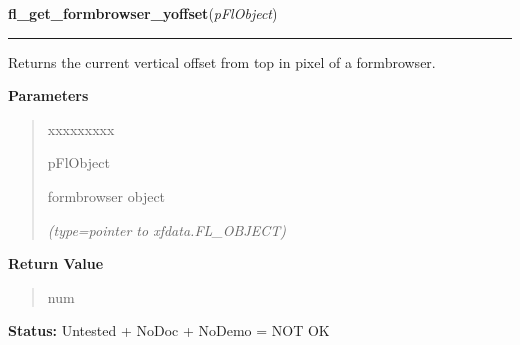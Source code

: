 \hspace{.8\funcindent}\begin{boxedminipage}{\funcwidth}

    \raggedright \textbf{fl\_get\_formbrowser\_yoffset}(\textit{pFlObject})

    \vspace{-1.5ex}

    \rule{\textwidth}{0.5\fboxrule}
\setlength{\parskip}{2ex}
    Returns the current vertical offset from top in pixel of a formbrowser.

\setlength{\parskip}{1ex}
      \textbf{Parameters}
      \vspace{-1ex}

      \begin{quote}
        \begin{Ventry}{xxxxxxxxx}

          \item[pFlObject]

          formbrowser object

            {\it (type=pointer to xfdata.FL\_OBJECT)}

        \end{Ventry}

      \end{quote}

      \textbf{Return Value}
    \vspace{-1ex}

      \begin{quote}
      num

      \end{quote}

\textbf{Status:} Untested + NoDoc + NoDemo = NOT OK



    \end{boxedminipage}

    \label{xformslib:flformbrowser:fl_find_formbrowser_form_number}

    \vspace{0.5ex}

